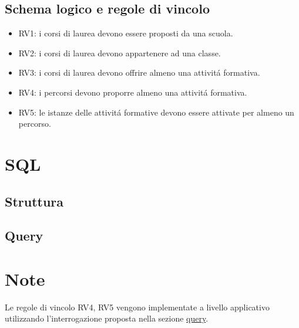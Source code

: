 \documentclass[a4paper,12pt,italian,towside]{article}
\begin{document}
\subsection{Schema logico e regole di vincolo}

\begin{itemize}
	\item RV1: i corsi di laurea devono essere proposti da una scuola.
	\item RV2: i corsi di laurea devono appartenere ad una classe.
	\item RV3: i corsi di laurea devono offrire almeno una attivit\'a formativa.
	\item RV4: i percorsi devono proporre almeno una attivit\'a formativa.
	\item RV5: le istanze delle attivit\'a formative devono essere attivate per almeno un percorso.
\end{itemize}

\newpage
\section{SQL}



\subsection{Struttura}



\subsection{Query}
\label{sql:query}


\newpage

\section{Note}

Le regole di vincolo RV4, RV5 vengono implementate a livello applicativo utilizzando l'interrogazione proposta nella sezione \hyperref[sql:query]{query}.


%
%

\end{document}
